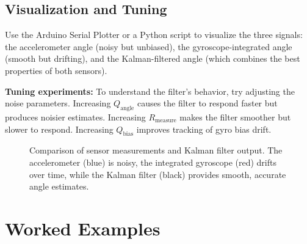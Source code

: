\subsection{Visualization and Tuning}

Use the Arduino Serial Plotter or a Python script to visualize the three signals: the accelerometer angle (noisy but unbiased), the gyroscope-integrated angle (smooth but drifting), and the Kalman-filtered angle (which combines the best properties of both sensors).

\textbf{Tuning experiments:} To understand the filter's behavior, try adjusting the noise parameters. Increasing $Q_{\text{angle}}$ causes the filter to respond faster but produces noisier estimates. Increasing $R_{\text{measure}}$ makes the filter smoother but slower to respond. Increasing $Q_{\text{bias}}$ improves tracking of gyro bias drift.

\begin{figure}[htbp]
\centering
{}
\caption{Comparison of sensor measurements and Kalman filter output. The accelerometer (blue) is noisy, the integrated gyroscope (red) drifts over time, while the Kalman filter (black) provides smooth, accurate angle estimates.}
\label{fig:sensor_fusion}
\end{figure}

\section{Worked Examples}

